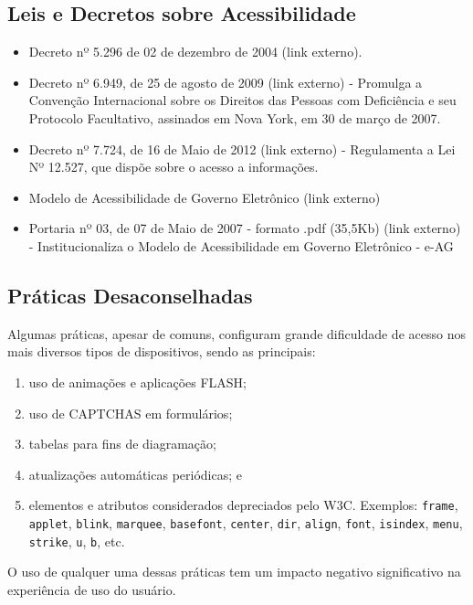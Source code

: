 \documentclass[
  12pt,
  openright,
  twoside,
  a4paper,
  english,
  french,
  spanish,
  brazil
]{abntex2}
\begin{document}
\subsection{Leis e Decretos sobre Acessibilidade}

\begin{itemize}
  \item Decreto nº 5.296 de 02 de dezembro de 2004 (link externo).
  \item
    Decreto nº 6.949, de 25 de agosto de 2009 (link externo) - Promulga a
    Convenção Internacional sobre os Direitos das Pessoas com Deficiência e seu
    Protocolo Facultativo, assinados em Nova York, em 30 de março de 2007.
  \item
    Decreto nº 7.724, de 16 de Maio de 2012 (link externo) - Regulamenta a Lei
    Nº 12.527, que dispõe sobre o acesso a informações.
  \item Modelo de Acessibilidade de Governo Eletrônico (link externo)
  \item
    Portaria nº 03, de 07 de Maio de 2007 - formato .pdf (35,5Kb) (link externo)
    - Institucionaliza o Modelo de Acessibilidade em Governo Eletrônico - e-AG
\end{itemize}

\subsection{Práticas Desaconselhadas}

Algumas práticas, apesar de comuns, configuram grande dificuldade de acesso nos
mais diversos tipos de dispositivos, sendo as principais:

\begin{enumerate}
  \item uso de animações e aplicações FLASH;
  \item uso de CAPTCHAS em formulários;
  \item tabelas para fins de diagramação;
  \item atualizações automáticas periódicas; e
  \item
    elementos e atributos considerados depreciados pelo W3C. Exemplos:
    \texttt{frame}, \texttt{applet}, \texttt{blink}, \texttt{marquee},
    \texttt{basefont}, \texttt{center}, \texttt{dir}, \texttt{align},
    \texttt{font}, \texttt{isindex}, \texttt{menu}, \texttt{strike}, \texttt{u},
    \texttt{b}, etc.
\end{enumerate}

O uso de qualquer uma dessas práticas tem um impacto negativo significativo na
experiência de uso do usuário.
\end{document}
